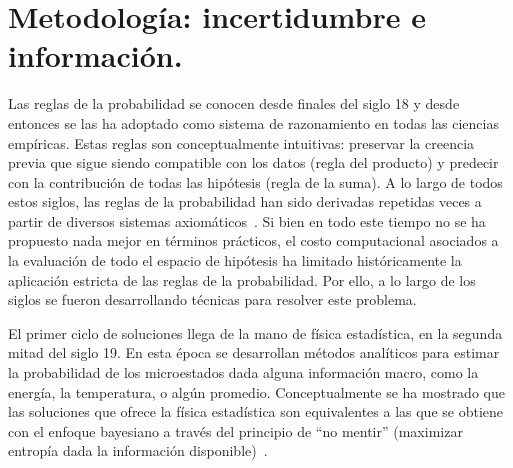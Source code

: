 \documentclass[a4paper,11pt]{book}
\theoremstyle{definition}
\begin{document}
\chapter{Metodología: incertidumbre e información.}




Las reglas de la probabilidad se conocen desde finales del siglo 18 y desde entonces se las ha adoptado como sistema de razonamiento en todas las ciencias empíricas.
%
Estas reglas son conceptualmente intuitivas: preservar la creencia previa que sigue siendo compatible con los datos (regla del producto) y predecir con la contribución de todas las hipótesis (regla de la suma).
%
A lo largo de todos estos siglos, las reglas de la probabilidad han sido derivadas repetidas veces a partir de diversos sistemas axiomáticos~\cite{halpern2017}.
%
Si bien en todo este tiempo no se ha propuesto nada mejor en términos prácticos, el costo computacional asociados a la evaluación de todo el espacio de hipótesis ha limitado históricamente la aplicación estricta de las reglas de la probabilidad.
%
Por ello, a lo largo de los siglos se fueron desarrollando técnicas para resolver este problema.


El primer ciclo de soluciones llega de la mano de física estadística, en la segunda mitad del siglo 19.
%
En esta época se desarrollan métodos analíticos para estimar la probabilidad de los microestados dada alguna información macro, como la energía, la temperatura, o algún promedio.
%
Conceptualmente se ha mostrado que las soluciones que ofrece la física estadística son equivalentes a las que se obtiene con el enfoque bayesiano a través del principio de ``no mentir'' (maximizar entropía dada la información disponible)~\cite{jaynes1957-informationTheoryAndStatisticalMechanics, jaynes2003-bookProbabilityTheory}.
\end{document}
